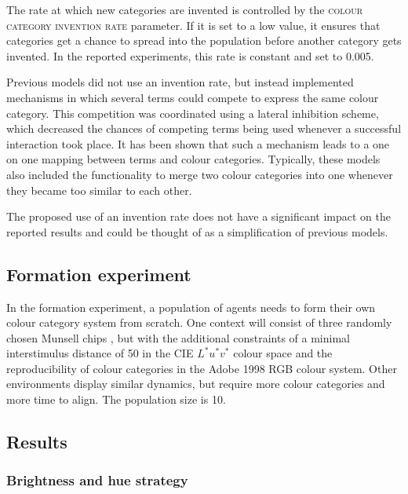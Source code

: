 The rate at which new categories are invented is controlled by the
\textsc{colour category invention rate}
parameter. If it is set to a low value, it ensures that categories get
a chance to spread into the population before another category gets
invented. In the reported experiments, this rate is constant and set
to 0.005.

Previous models \citep{steels05coordinating, belpaeme05explaining,
  belpaeme07language} did not use an invention rate, but instead implemented
mechanisms in which several terms could compete to express the same
colour category. This competition was coordinated using a lateral
inhibition scheme, which decreased the chances of competing terms being used
whenever a successful interaction took place. It has been shown that
such a mechanism leads to a one on one mapping between terms and
colour categories. Typically, these models also included the
functionality to merge two colour categories into one whenever they
became too similar to each other. 

The proposed use of an invention rate does not have a significant
impact on the reported results and could be thought of as a
simplification of previous models.

\subsection{Formation experiment}
\label{s:formation-experiment}

In the formation experiment, a population of agents needs to form
their own colour category system from scratch. One context will
consist of three randomly chosen Munsell chips \citep{newhall42final},
but with the additional constraints of a minimal
interstimulus distance of 50 in the CIE $L^*u^*v^*$ colour space and
the reproducibility of colour categories in the Adobe 1998 RGB
colour system. Other environments display similar dynamics, but
require more colour categories and more time to align. The population
size is 10.

\subsection{Results}

\subsubsection{Brightness and hue strategy}

